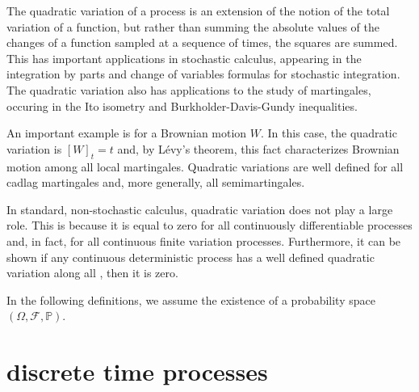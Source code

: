 \documentclass[12pt]{article}
\begin{document}

The quadratic variation of a process is an extension of the notion of the total variation of a function, but rather than summing the absolute values of the changes of a function sampled at a sequence of times, the squares are summed.
This has important applications in stochastic calculus, appearing in the integration by parts and change of variables formulas for stochastic integration. The quadratic variation also has applications to the study of martingales, occuring in the Ito isometry and Burkholder-Davis-Gundy inequalities.

An important example is for a Brownian motion $W$. In this case, the quadratic variation is $[W]_t=t$ and, by L\'evy's theorem, this fact characterizes Brownian motion among all local martingales.
Quadratic variations are well defined for all cadlag martingales and, more generally, all semimartingales.

In standard, non-stochastic calculus, quadratic variation does not play a large role. This is because it is equal to zero for all continuously differentiable processes and, in fact, for all continuous finite variation processes. Furthermore, it can be shown if any continuous deterministic process has a well defined quadratic variation along all , then it is zero.

In the following definitions, we assume the existence of a probability space $(\Omega,\mathcal{F},\mathbb{P})$.

\section{discrete time processes}
\end{document}
